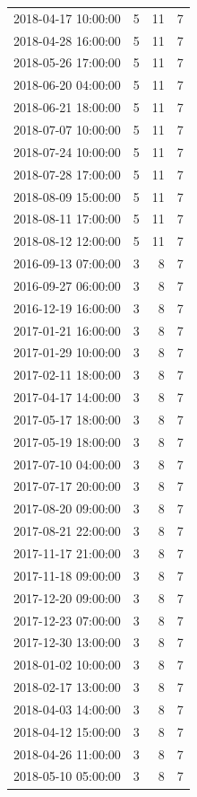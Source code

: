\begin{tabular}{lrrr}
2018-04-17 10:00:00 & 5 & 11 & 7 \\
2018-04-28 16:00:00 & 5 & 11 & 7 \\
2018-05-26 17:00:00 & 5 & 11 & 7 \\
2018-06-20 04:00:00 & 5 & 11 & 7 \\
2018-06-21 18:00:00 & 5 & 11 & 7 \\
2018-07-07 10:00:00 & 5 & 11 & 7 \\
2018-07-24 10:00:00 & 5 & 11 & 7 \\
2018-07-28 17:00:00 & 5 & 11 & 7 \\
2018-08-09 15:00:00 & 5 & 11 & 7 \\
2018-08-11 17:00:00 & 5 & 11 & 7 \\
2018-08-12 12:00:00 & 5 & 11 & 7 \\
2016-09-13 07:00:00 & 3 & 8 & 7 \\
2016-09-27 06:00:00 & 3 & 8 & 7 \\
2016-12-19 16:00:00 & 3 & 8 & 7 \\
2017-01-21 16:00:00 & 3 & 8 & 7 \\
2017-01-29 10:00:00 & 3 & 8 & 7 \\
2017-02-11 18:00:00 & 3 & 8 & 7 \\
2017-04-17 14:00:00 & 3 & 8 & 7 \\
2017-05-17 18:00:00 & 3 & 8 & 7 \\
2017-05-19 18:00:00 & 3 & 8 & 7 \\
2017-07-10 04:00:00 & 3 & 8 & 7 \\
2017-07-17 20:00:00 & 3 & 8 & 7 \\
2017-08-20 09:00:00 & 3 & 8 & 7 \\
2017-08-21 22:00:00 & 3 & 8 & 7 \\
2017-11-17 21:00:00 & 3 & 8 & 7 \\
2017-11-18 09:00:00 & 3 & 8 & 7 \\
2017-12-20 09:00:00 & 3 & 8 & 7 \\
2017-12-23 07:00:00 & 3 & 8 & 7 \\
2017-12-30 13:00:00 & 3 & 8 & 7 \\
2018-01-02 10:00:00 & 3 & 8 & 7 \\
2018-02-17 13:00:00 & 3 & 8 & 7 \\
2018-04-03 14:00:00 & 3 & 8 & 7 \\
2018-04-12 15:00:00 & 3 & 8 & 7 \\
2018-04-26 11:00:00 & 3 & 8 & 7 \\
2018-05-10 05:00:00 & 3 & 8 & 7 \\

\end{tabular}

